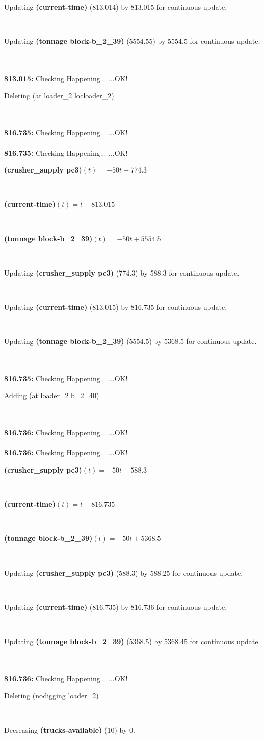 \documentclass[a4paper,12pt]{article}
\newcommand{\atime}[1]{{\bf #1:}}
\newcommand{\exprn}[1]{{\sf #1}}
\newcommand{\fexprn}[1]{{\small {\bf #1}}}
\newcommand{\checkhappening}{Checking Happening... }
\newcommand{\listrow}[1]{\begin{minipage}[t]{11.5cm} #1 \end{minipage}}
\newcommand{\happeningOK}{...OK!}
\newcommand{\assignmentcts}[3]{\listrow{Updating \fexprn{#1} (#2) by #3 for continuous update.}}
\newcommand{\decrease}[3]{\listrow{Decreasing \fexprn{#1} (#2) by #3.}}
\newcommand{\function}[2]{\listrow{\fexprn{#1}$(t) = #2$}}
\newcommand{\adding}[1]{\listrow{Adding \exprn{#1} }}
\newcommand{\deleting}[1]{\listrow{Deleting \exprn{#1} }}
\begin{document}
\begin{tabbing}
 \> \assignmentcts{(current-time)}{813.014}{813.015}\\
 \> \assignmentcts{(tonnage block-b\_2\_39)}{5554.55}{5554.5}\\
\\
\atime{813.015} \> \checkhappening\happeningOK\\
 \> \deleting{(at loader\_2 locloader\_2)}\\
\\
\atime{816.735} \> \checkhappening\happeningOK\\
\\
\atime{816.735} \> \checkhappening\happeningOK\\
 \> \function{(crusher\_supply pc3)}{ - 50t + 774.3}\\
 \> \function{(current-time)}{t + 813.015}\\
 \> \function{(tonnage block-b\_2\_39)}{ - 50t + 5554.5}\\
 \> \assignmentcts{(crusher\_supply pc3)}{774.3}{588.3}\\
 \> \assignmentcts{(current-time)}{813.015}{816.735}\\
 \> \assignmentcts{(tonnage block-b\_2\_39)}{5554.5}{5368.5}\\
\\
\atime{816.735} \> \checkhappening\happeningOK\\
 \> \adding{(at loader\_2 b\_2\_40)}\\
\\
\atime{816.736} \> \checkhappening\happeningOK\\
\\
\atime{816.736} \> \checkhappening\happeningOK\\
 \> \function{(crusher\_supply pc3)}{ - 50t + 588.3}\\
 \> \function{(current-time)}{t + 816.735}\\
 \> \function{(tonnage block-b\_2\_39)}{ - 50t + 5368.5}\\
 \> \assignmentcts{(crusher\_supply pc3)}{588.3}{588.25}\\
 \> \assignmentcts{(current-time)}{816.735}{816.736}\\
 \> \assignmentcts{(tonnage block-b\_2\_39)}{5368.5}{5368.45}\\
\\
\atime{816.736} \> \checkhappening\happeningOK\\
 \> \deleting{(nodigging loader\_2)}\\
 \> \decrease{(trucks-available)}{10}{0}\\

\end{tabbing}
\end{document}
